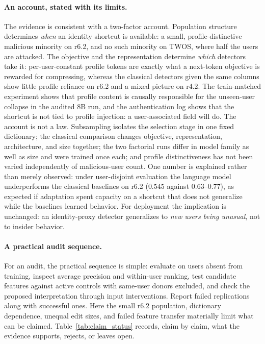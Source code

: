 \documentclass[10pt]{article} %
\begin{document}
\paragraph{An account, stated with its limits.}
The evidence is consistent with a two-factor account. Population structure
determines \emph{when} an identity shortcut is available: a small,
profile-distinctive malicious minority on r6.2, and no such minority on TWOS,
where half the users are attacked. The objective and the representation
determine \emph{which} detectors take it: per-user-constant profile tokens
are exactly what a next-token objective is rewarded for compressing, whereas
the classical detectors given the same columns show little profile reliance
on r6.2 and a mixed picture on r4.2. The train-matched experiment shows that
profile content is causally responsible for the unseen-user collapse in the
audited 8B run, and the authentication log shows that the shortcut is not
tied to profile injection: a user-associated field will do. The account is
not a law. Subsampling isolates the selection stage in one fixed dictionary;
the classical comparison changes objective, representation, architecture, and
size together; the two factorial runs differ in model family as well as size
and were trained once each; and profile distinctiveness has not been varied
independently of malicious-user count. One number is explained rather than
merely observed: under user-disjoint evaluation the language model
underperforms the classical baselines on r6.2 ($0.545$ against
$0.63$--$0.77$), as expected if adaptation spent capacity on a shortcut that
does not generalize while the baselines learned behavior. For deployment the
implication is unchanged: an identity-proxy detector generalizes to
\emph{new users being unusual}, not to insider behavior.

\paragraph{A practical audit sequence.}
For an audit, the practical sequence is simple: evaluate on users absent
from training, inspect average precision and within-user ranking, test
candidate features against active controls with same-user donors excluded,
and check the proposed interpretation through input interventions.
Report failed replications along with successful ones. Here the small
r6.2 population, dictionary dependence, unequal edit sizes, and failed
feature transfer materially limit what can be claimed.
Table~\ref{tab:claim_status} records, claim by claim, what the evidence
supports, rejects, or leaves open.
\end{document}
